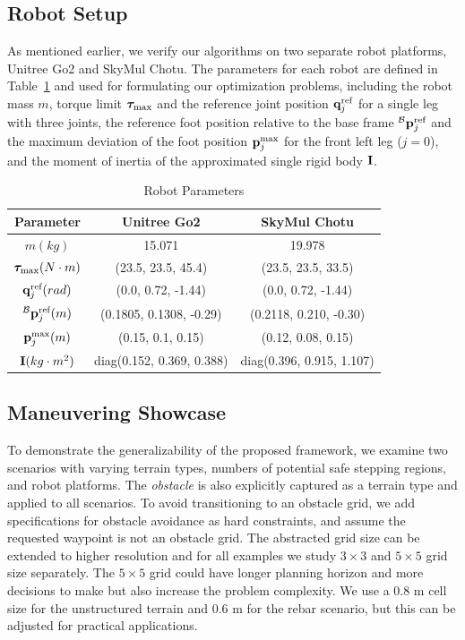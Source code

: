 \documentclass[letterpaper, 10 pt, conference]{ieeeconf}
\begin{document}
\subsection{Robot Setup}
As mentioned earlier, we verify our algorithms on two separate robot platforms, Unitree Go2 and SkyMul Chotu. The parameters for each robot are defined in Table~\ref{tab:robot_parameter} and used for formulating our optimization problems, including the robot mass $m$, torque limit $\bm{\tau}_{\text{max}}$ and the reference joint position $\mathbf{q}_j^{\text{ref}}$ for a single leg with three joints, the reference foot position relative to the base frame $^\mathcal{B} \mathbf{p}_j^{\text{ref}}$ and the maximum deviation of the foot position $\mathbf{p}_j^{\text{max}}$ for the front left leg ($j=0$), and the moment of inertia of the approximated single rigid body $\mathbf{I}$.
\begin{table}[t]
    \caption{Robot Parameters}
    \centering
     \begin{tabular}{c | c | c}
         \hline
         Parameter & Unitree Go2 & SkyMul Chotu\\\hline
         $m (kg)$ & 15.071 & 19.978\\
         $\bm{\tau}_{\text{max}} (N \cdot m)$ & (23.5, 23.5, 45.4) & (23.5, 23.5, 33.5)\\
         $\mathbf{q}_j^{\text{ref}}(rad)$ & (0.0, 0.72, -1.44) & (0.0, 0.72, -1.44)\\
         $^\mathcal{B} \mathbf{p}_j^{\text{ref}}(m)$ & (0.1805, 0.1308, -0.29) & (0.2118, 0.210, -0.30)\\
         $\mathbf{p}_j^{\text{max}}(m)$ & (0.15, 0.1, 0.15) & (0.12, 0.08, 0.15)\\
         $\mathbf{I} (kg \cdot m^2)$ & diag(0.152, 0.369, 0.388) & diag(0.396, 0.915, 1.107)\\
         \hline
    \end{tabular}
    \label{tab:robot_parameter}
\end{table}

\subsection{Maneuvering Showcase}
To demonstrate the generalizability of the proposed framework, we examine two scenarios with varying terrain types, numbers of potential safe stepping regions, and robot platforms. The \textit{obstacle} is also explicitly captured as a terrain type and applied to all scenarios. To avoid transitioning to an obstacle grid, we add specifications for obstacle avoidance as hard constraints, and assume the requested waypoint is not an obstacle grid. The abstracted grid size can be extended to higher resolution and for all examples we study $3 \times 3$ and $5 \times 5$ grid size separately. The $5 \times 5$ grid could have longer planning horizon and more decisions to make but also increase the problem complexity. We use a 0.8 m cell size for the unstructured terrain and 0.6 m for the rebar scenario, but this can be adjusted for practical applications.
\end{document}
